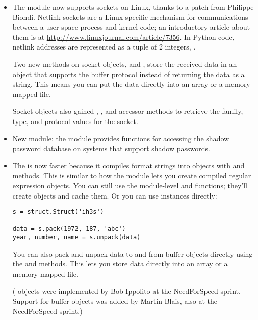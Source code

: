 \documentclass{howto}
\begin{document}
\begin{itemize}
\item The  module now supports 
sockets on Linux, thanks to a patch from Philippe Biondi.  
Netlink sockets are a Linux-specific mechanism for communications
between a user-space process and kernel code; an introductory 
article about them is at \url{http://www.linuxjournal.com/article/7356}.
In Python code, netlink addresses are represented as a tuple of 2 integers, 
.

Two new methods on socket objects,  and
, store the received data in an object 
that supports the buffer protocol instead of returning the data as a
string.  This means you can put the data directly into an array or a
memory-mapped file.

Socket objects also gained , ,
and  accessor methods to retrieve the family, type,
and protocol values for the socket.

\item New module: the  module provides functions for
accessing the shadow password database on systems that support 
shadow passwords.

\item The  is now faster because it 
compiles format strings into  objects
with  and  methods.  This is similar
to how the  module lets you create compiled regular
expression objects.  You can still use the module-level 
 and  functions; they'll create 
 objects and cache them.  Or you can use 
 instances directly:

\begin{verbatim}
s = struct.Struct('ih3s')

data = s.pack(1972, 187, 'abc')
year, number, name = s.unpack(data)
\end{verbatim}

You can also pack and unpack data to and from buffer objects directly
using the  and 
methods.  This lets you store data directly into an array or a
memory-mapped file.

( objects were implemented by Bob Ippolito at the
NeedForSpeed sprint.  Support for buffer objects was added by Martin
Blais, also at the NeedForSpeed sprint.)


\end{itemize}
\end{document}

